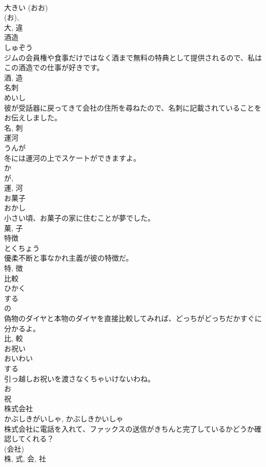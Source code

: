 \documentclass[8pt]{extreport}
\begin{document}
\begin{CJK}{UTF8}{min}
\\	大きい (おお) 
\\	(お), 
\\	大, 違	
\\	酒造	
\\	しゅぞう	
\\	ジムの会員権や食事だけではなく酒まで無料の特典として提供されるので、私はこの酒造での仕事が好きです。	
\\	酒, 造	
\\	名刺	
\\	めいし	
\\	彼が受話器に戻ってきて会社の住所を尋ねたので、名刺に記載されていることをお伝えしました。	
\\	名, 刺	
\\	運河	
\\	うんが	
\\	冬には運河の上でスケートができますよ。	
\\	か 
\\	が, 
\\	運, 河	
\\	お菓子	
\\	おかし	
\\	小さい頃、お菓子の家に住むことが夢でした。	
\\	菓, 子	
\\	特徴	
\\	とくちょう	
\\	優柔不断と事なかれ主義が彼の特徴だ。	
\\	特, 徴	
\\	比較	
\\	ひかく	
\\	する 
\\	の 
\\	偽物のダイヤと本物のダイヤを直接比較してみれば、どっちがどっちだかすぐに分かるよ。	
\\	比, 較	
\\	お祝い	
\\	おいわい	
\\	する 
\\	引っ越しお祝いを渡さなくちゃいけないわね。	
\\	お 
\\	祝	
\\	株式会社	
\\	かぶしきがいしゃ, かぶしきかいしゃ	
\\	株式会社に電話を入れて、ファックスの送信がきちんと完了しているかどうか確認してくれる？	
\\	(会社) 
\\	株, 式, 会, 社	

\end{CJK}
\end{document}
